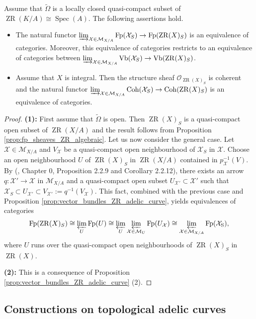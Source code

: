 \documentclass [11pt,reqno]{amsart}
\newcommand{\1}{\mathmybb{1}}
\def\cM{{\mathcal{M}}}
\def\cO{{\mathcal{O}}}
\def\cX{{\mathcal{X}}}
\def\Spec{\operatorname{Spec}}
\def\ZR{\operatorname{ZR}}
\def\tilde{\widetilde}
\begin{document}
\begin{proposition}
\label{prop:coherent_sheaves_locally_closed_integral}
Assume that $\tilde{\Omega}$ is a locally closed quasi-compact subset of $\ZR(K/A)\cong\Spec(A)$. The following assertions hold.
\begin{itemize}
	\item[(1)] The natural functor $\varinjlim_{\cX\in\cM_{X/A}}\mathrm{Fp}(\cX_{S}) \to \mathrm{Fp}(\ZR(X)_{S})$ is an equivalence of categories. Moreover, this equivalence of categories restricts to an equivalence of categories between $\varinjlim_{\cX\in\cM_{X/A}}\mathrm{Vb}(\cX_{S}) \to \mathrm{Vb}(\ZR(X)_{S})$.
	\item[(2)] Assume that $X$ is integral. Then the structure sheaf $\cO_{\ZR(X)_{S}}$ is coherent and the natural functor $\varinjlim_{\cX\in\cM_{X/A}}\mathrm{Coh}(\cX_{S}) \to \mathrm{Coh}(\ZR(X)_{S})$ is an equivalence of categories.
\end{itemize}
\end{proposition}

\begin{proof}
\textbf{(1):} First assume that $\tilde{\Omega}$ is open. Then $\ZR(X)_{S}$ is a quasi-compact open subset of $\ZR(X/A)$ and the result follows from Proposition \ref{prop:fp_sheaves_ZR_algebraic}. Let us now consider the general case. Let $\cX\in\cM_{X/A}$ and $V_{\cX}$ be a quasi-compact open neighbourhood of $\cX_{S}$ in $\cX$. Choose an open neighbourhood $U$ of $\ZR(X)_{S}$ in $\ZR(X/A)$ contained in $p_{\cX}^{-1}(V)$. By (\cite{Fujiwara-Kato}, Chapter 0, Proposition 2.2.9 and Corollary 2.2.12), there exists an arrow $q:\cX'\to\cX$ in $\cM_{X/A}$ and a quasi-compact open subset $U_{\cX'}\subset \cX'$ such that $\cX_{S}\subset U_{\cX'}\subset V_{\cX'}:=q^{-1}(V_{\cX})$. This fact, combined with the previous case and Proposition \ref{prop:vector_bundles_ZR_adelic_curve}, yields equivalences of categories
\begin{align*}
\mathrm{Fp}(\ZR(X)_{S})\cong \displaystyle\varprojlim_{U}\mathrm{Fp}(U) \cong \varprojlim_{U}\varprojlim_{\cX\in\cM_{U}}\mathrm{Fp}(U_{\cX}) \cong \varprojlim_{\cX\in\cM_{X/A}}\mathrm{Fp(\cX_{S})},
\end{align*}
where $U$ runs over the quasi-compact open neighbourhoods of $\ZR(X)_{S}$ in $\ZR(X)$.

\textbf{(2):} This is a consequence of Proposition \ref{prop:vector_bundles_ZR_adelic_curve} (2).
\end{proof}

\subsection{Constructions on topological adelic curves}
\label{sub:constructions_tac}
\end{document}
